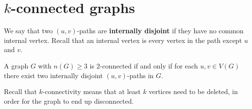 \section{$k$-connected graphs}%
\label{sec:4.2}

We say that two $(u,v)$-paths are \textbf{internally disjoint} if they have no common internal vertex. Recall that an internal vertex is every vertex in the path except $u$ and $v$.

\begin{theorem}
	\label{the:4.2.2}
	A graph $G$ with $n(G) \ge 3$ is $2$-connected if and only if for each $u,v \in V(G)$ there exist two internally disjoint $(u,v)$-paths in $G$.
\end{theorem}
Recall that $k$-connectivity means that at least $k$ vertices need to be deleted, in order for the graph to end up disconnected.


